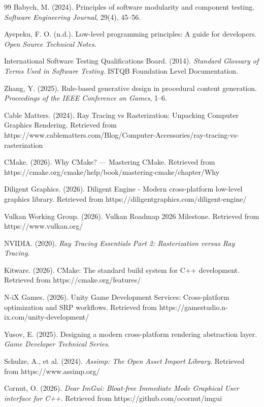 \documentclass[manuscript,screen,12pt]{article}
\begin{document}
\begin{thebibliography}{99}
Babych, M. (2024). 
Principles of software modularity and component testing. 
\textit{Software Engineering Journal}, 29(4), 45–56.

Ayepeku, F. O. (n.d.). 
Low-level programming principles: A guide for developers. 
\textit{Open Source Technical Notes}.

International Software Testing Qualifications Board. (2014). 
\textit{Standard Glossary of Terms Used in Software Testing}. 
ISTQB Foundation Level Documentation.

Zhang, Y. (2025). 
Rule-based generative design in procedural content generation. 
\textit{Proceedings of the IEEE Conference on Games}, 1–6.

Cable Matters. (2024). 
Ray Tracing vs Rasterization: Unpacking Computer Graphics Rendering. 
Retrieved from https://www.cablematters.com/Blog/Computer-Accessories/ray-tracing-vs-rasterization

CMake. (2026). 
Why CMake? — Mastering CMake. 
Retrieved from https://cmake.org/cmake/help/book/mastering-cmake/chapter/Why%

Diligent Graphics. (2026). 
Diligent Engine - Modern cross-platform low-level graphics library. 
Retrieved from https://diligentgraphics.com/diligent-engine/

Vulkan Working Group. (2026). 
Vulkan Roadmap 2026 Milestone. 
Retrieved from https://www.vulkan.org/

NVIDIA. (2020). 
\textit{Ray Tracing Essentials Part 2: Rasterization versus Ray Tracing}.

Kitware. (2026). 
CMake: The standard build system for C++ development. 
Retrieved from https://cmake.org/features/

N-iX Games. (2026). 
Unity Game Development Services: Cross-platform optimization and SRP workflows. 
Retrieved from https://gamestudio.n-ix.com/unity-development/

Yusov, E. (2025). 
Designing a modern cross-platform rendering abstraction layer. 
\textit{Game Developer Technical Series}.

Schulze, A., et al. (2024).
\textit{Assimp: The Open Asset Import Library}.
Retrieved from https://www.assimp.org/

Cornut, O. (2026).
\textit{Dear ImGui: Bloat-free Immediate Mode Graphical User interface for C++}.
Retrieved from https://github.com/ocornut/imgui

\end{thebibliography}
\end{document}
